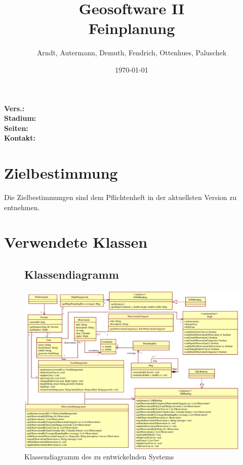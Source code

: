 \documentclass[a4paper,11pt]{scrartcl}
\begin{document}
\title{Geosoftware II \\ \small Feinplanung}
\author{Arndt, Autermann, Demuth, Fendrich, Ottenhues, Paluschek}
\date{\today}
\maketitle
\thispagestyle{empty}

\begin{center}
\bf Vers.: \MyVersion \\
\bf Stadium: \MyStatus\\
\bf Seiten: \thelastpage \\
\bf Kontakt: \email \\
\end{center}
\newpage

\tableofcontents

\newpage

\section{Zielbestimmung}
	Die Zielbestimmungen sind dem Pflichtenheft in der aktuellsten Version zu entnehmen.\\

\section{Verwendete Klassen}

\begin{landscape}
\begin{figure}[htbp]
\subsection{Klassendiagramm}
		\centering
		\includegraphics[width=1.3\textwidth]{images/classes.eps}
		\caption{Klassendiagramm des zu entwickelnden Systems}
		\label{Klassendiagramm}

\end{figure}
\end{landscape}
\end{document}

